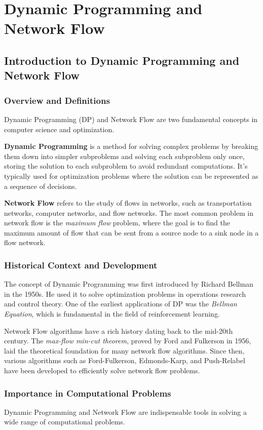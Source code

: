 \documentclass[12pt]{book} %
\begin{document}
\chapter{Dynamic Programming and Network Flow}
\section{Introduction to Dynamic Programming and Network Flow}

\subsection{Overview and Definitions}
Dynamic Programming (DP) and Network Flow are two fundamental concepts in computer science and optimization. 

\textbf{Dynamic Programming} is a method for solving complex problems by breaking them down into simpler subproblems and solving each subproblem only once, storing the solution to each subproblem to avoid redundant computations. It's typically used for optimization problems where the solution can be represented as a sequence of decisions.

\textbf{Network Flow} refers to the study of flows in networks, such as transportation networks, computer networks, and flow networks. The most common problem in network flow is the \textit{maximum flow} problem, where the goal is to find the maximum amount of flow that can be sent from a source node to a sink node in a flow network.

\subsection{Historical Context and Development}
The concept of Dynamic Programming was first introduced by Richard Bellman in the 1950s. He used it to solve optimization problems in operations research and control theory. One of the earliest applications of DP was the \textit{Bellman Equation}, which is fundamental in the field of reinforcement learning.

Network Flow algorithms have a rich history dating back to the mid-20th century. The \textit{max-flow min-cut theorem}, proved by Ford and Fulkerson in 1956, laid the theoretical foundation for many network flow algorithms. Since then, various algorithms such as Ford-Fulkerson, Edmonds-Karp, and Push-Relabel have been developed to efficiently solve network flow problems.

\subsection{Importance in Computational Problems}
Dynamic Programming and Network Flow are indispensable tools in solving a wide range of computational problems.
\end{document}
